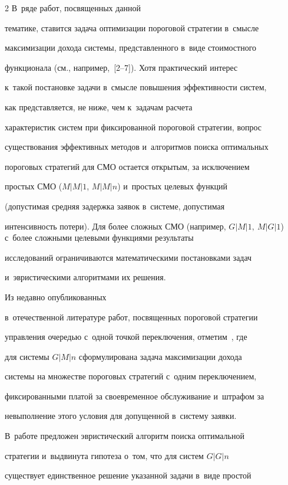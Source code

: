 \begin{multicols}{2}
В~ряде работ, посвященных данной


тематике, ставится задача оптимизации пороговой стратегии в~смысле


максимизации дохода системы, пред\-став\-лен\-но\-го в~виде стоимостного


функционала (см., например,~[2--7]). Хотя практический интерес 


к~такой постановке задачи в~смысле повышения эффективности сис\-тем,


как  пред\-став\-ля\-ет\-ся, не ниже, чем к~задачам расчета


характеристик систем при фиксированной пороговой стратегии, вопрос


существования эффективных методов и~алгоритмов поиска оптимальных


пороговых стратегий для СМО остается открытым, за исключением


простых СМО ($M|M|1$,  $M|M|n$) и~простых целевых функций


(допустимая средняя задержка заявок в~системе, допустимая


интенсивность потери). Для более сложных СМО (например, $G|M|1,\


M|G|1$) с~более сложными целевыми функциями результаты


исследований ограничиваются математическими постановками задач 


и~эвристическими алгоритмами их решения. 





Из недавно опубликованных 


в~отечественной литературе работ,  посвященных пороговой стратегии


управления очередью с~одной  точкой переключения, отметим~\cite{3-aga}, где


для системы $G|M|n$ сформулирована задача максимизации дохода


сис\-те\-мы на множестве пороговых стратегий с~одним переключением,


фиксированными платой за своевременное обслуживание и~штрафом за


невыполнение этого условия для допущенной в~сис\-те\-му заявки. 


В~работе предложен эвристический алгоритм поиска оптимальной


стратегии и~выдвинута гипотеза о~том, что для сис\-тем $G|G|n$


существует единственное решение указанной задачи в~виде прос\-той



\end{multicols}
